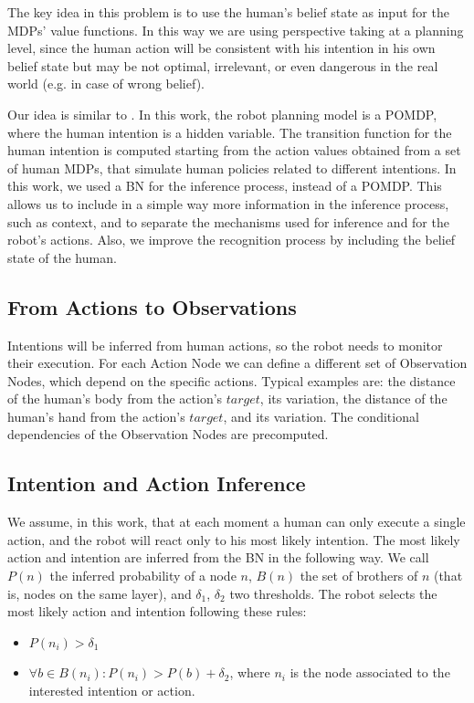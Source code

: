 
The key idea in this problem is to use the human's belief state as input for the MDPs' value functions. In this way we are using perspective taking at a planning level, since the human action will be consistent with his intention in his own belief state but may be not optimal, irrelevant, or even dangerous in the real world (e.g. in case of wrong belief).

Our idea is similar to \cite{karami2010human}. In this work, the robot planning model is a POMDP, where the human intention is a hidden variable. The transition function for the human intention is computed starting from the action values obtained from a set of human MDPs, that simulate human policies related to different intentions. In this work, we used a BN for the inference process, instead of a POMDP. This allows us to include in a simple way more information in the inference process, such as context, and to separate the mechanisms used for inference and for the robot's actions. Also, we improve the recognition process by including the belief state of the human.

\subsection{From Actions to Observations}
Intentions will be inferred from human actions, so the robot needs to monitor their execution. For each Action Node we can define a different set of Observation Nodes, which depend on the specific actions. Typical examples are: the distance of the human's body from the action's $target$, its variation, the distance of the human's hand from the action's $target$, and its variation. The conditional dependencies of the Observation Nodes are precomputed.

\subsection{Intention and Action Inference}
\label{sec:situation_assessment-intention and action inference}
We assume, in this work, that at each moment a human can only execute a single action, and the robot will react only to his most likely intention. The most likely action and intention are inferred from the BN in the following way. We call $P(n)$ the inferred probability of a node $n$, $B(n)$ the set of brothers of $n$ (that is, nodes on the same layer), and $\delta_1$, $\delta_2$ two thresholds. The robot selects the most likely action and intention following these rules: 
\begin{itemize}
\item  \(P(n_i)>\delta_1\) 
\item  \(\forall b \in B(n_i): P(n_i)>P(b)+\delta_2\), where $n_i$ is the node associated to the interested intention or action.
\end{itemize}


